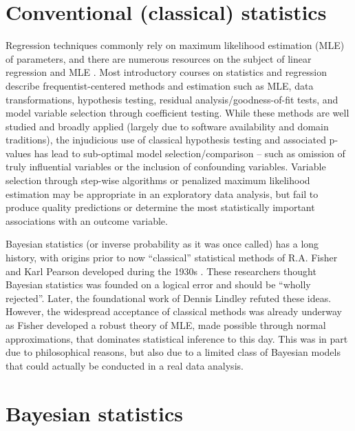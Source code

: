 \documentclass[11pt, oneside, openany]{scrbook}
\begin{document}
\hypertarget{conventional-classical-statistics}{%
\section{Conventional (classical) statistics}\label{conventional-classical-statistics}}

Regression techniques commonly rely on maximum likelihood estimation (MLE) of parameters, and there are numerous resources on the subject of linear regression and MLE \citep{johnson2002applied, larsen2005introduction, sheather2009modern, navidi2015statistics}. Most introductory courses on statistics and regression describe frequentist-centered methods and estimation such as MLE, data transformations, hypothesis testing, residual analysis/goodness-of-fit tests, and model variable selection through coefficient testing. While these methods are well studied and broadly applied (largely due to software availability and domain traditions), the injudicious use of classical hypothesis testing and associated p-values has lead to sub-optimal model selection/comparison -- such as omission of truly influential variables or the inclusion of confounding variables. Variable selection through step-wise algorithms or penalized maximum likelihood estimation \citep{hoerl1970ridge, tibshirani1996regression} may be appropriate in an exploratory data analysis, but fail to produce quality predictions or determine the most statistically important associations with an outcome variable.

Bayesian statistics (or inverse probability as it was once called) has a long history, with origins prior to now ``classical'' statistical methods of R.A. Fisher and Karl Pearson developed during the 1930s \citep{fisher1934statistical}. These researchers thought Bayesian statistics was founded on a logical error and should be ``wholly rejected''. Later, the foundational work of Dennis Lindley \citep{lindley2000philosophy} refuted these ideas. However, the widespread acceptance of classical methods was already underway as Fisher developed a robust theory of MLE, made possible through normal approximations, that dominates statistical inference to this day. This was in part due to philosophical reasons, but also due to a limited class of Bayesian models that could actually be conducted in a real data analysis.

\hypertarget{bayesian-statistics}{%
\section{Bayesian statistics}\label{bayesian-statistics}}
\end{document}
